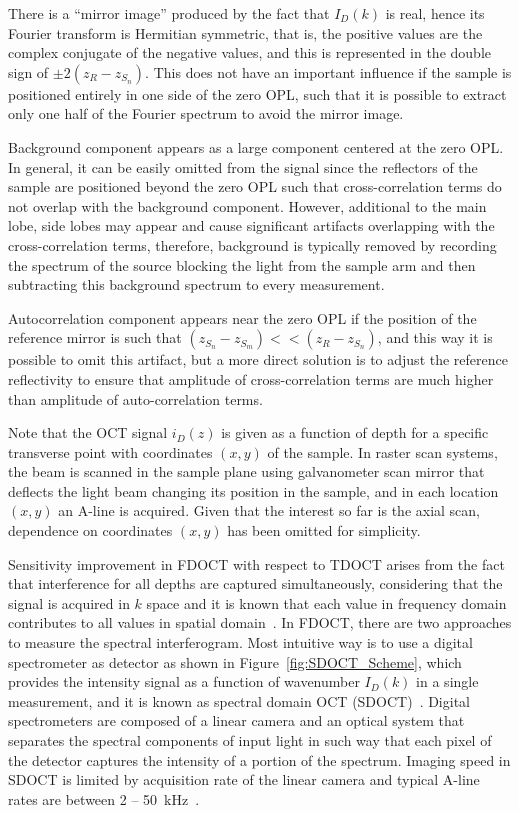 There is a ``mirror image'' produced by the fact that $I_D(k)$ is real, hence its Fourier transform is Hermitian symmetric, that is, the positive values are the complex conjugate of the negative values, and this is represented in the double sign of $\pm2(z_R-z_{S_n})$. This does not have an important influence if the sample is positioned entirely in one side of the zero OPL, such that it is possible to extract only one half of the Fourier spectrum to avoid the mirror image. 

Background component appears as a large component centered at the zero OPL. In general, it can be easily omitted from the signal since the reflectors of the sample are positioned beyond the zero OPL such that cross-correlation terms do not overlap with the background component. However, additional to the main lobe, side lobes may appear and cause significant artifacts overlapping with the cross-correlation terms, therefore, background is typically removed by recording the spectrum of the source blocking the light from the sample arm and then subtracting this background spectrum to every measurement.

Autocorrelation component appears near the zero OPL if the position of the reference mirror is such that $(z_{S_n}-z_{S_m}) << (z_R-z_{S_n})$, and this way it is possible to omit this artifact, but a more direct solution is to adjust the reference reflectivity to ensure that amplitude of cross-correlation terms are much higher than amplitude of auto-correlation terms.

Note that the OCT signal $i_D(z)$ is given as a function of depth for a specific transverse point with coordinates $(x,y)$ of the sample. In raster scan systems, the beam is scanned in the sample plane using galvanometer scan mirror that deflects the light beam changing its position in the sample, and in each location $(x,y)$ an A-line is acquired. Given that the interest so far is the axial scan, dependence on coordinates $(x,y)$ has been omitted for simplicity.
 
Sensitivity improvement in FDOCT with respect to TDOCT arises from the fact that interference for all depths are captured simultaneously, considering that the signal is acquired in $k$ space and it is known that each value in frequency domain contributes to all values in spatial domain~\cite{deBoer2003_Improved}. In FDOCT, there are two approaches to measure the spectral interferogram. Most intuitive way is to use a digital spectrometer as detector as shown in Figure~\ref{fig:SDOCT_Scheme}, which provides the intensity signal as a function of wavenumber $I_D(k)$ in a single measurement, and it is known as spectral domain OCT (SDOCT)~\cite{Fercher1995_Measurement}. Digital spectrometers are composed of a linear camera and an optical system that separates the spectral components of input light in such way that each pixel of the detector captures the intensity of a portion of the spectrum. Imaging speed in SDOCT is limited by acquisition rate of the linear camera and typical A-line rates are between 2 -- 50~kHz~\cite{Fujimoto2015_Introduction}.

